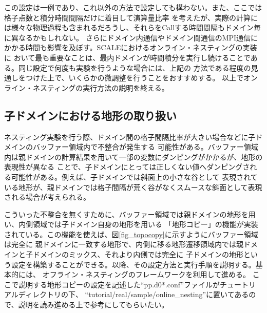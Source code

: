 この設定は一例であり、これ以外の方法で設定しても構わない。また、ここでは格子点数と積分時間間隔だけに着目して演算量比率
を考えたが、実際の計算には様々な物理過程も含まれるだろうし、それらをCallする時間間隔もドメイン毎に異なるかもしれない。
さらにドメイン内通信やドメイン間通信のMPI通信にかかる時間も影響を及ぼす。SCALEにおけるオンライン・ネスティングの実装に
おいて最も重要なことは、最内ドメインが時間積分を実行し続けることである。同じ設定で何度も実験を行うような場合には、上記の
方法である程度の見通しをつけた上で、いくらかの微調整を行うことをおすすめする。
以上でオンライン・ネスティングの実行方法の説明を終える。


\subsection{子ドメインにおける地形の取り扱い} \label{sec:nest_topo}
ネスティング実験を行う際、ドメイン間の格子間隔比率が大きい場合などに子ドメインのバッファー領域内で不整合が発生する
可能性がある。バッファー領域内は親ドメインの計算結果を用いて一部の変数にダンピングがかかるが、地形の表現性が異なる
ことで、子ドメインにとっては正しくない値へダンピングされる可能性がある。例えば、子ドメインでは斜面上の小さな谷として
表現されている地形が、親ドメインでは格子間隔が荒く谷がなくスムースな斜面として表現される場合が考えられる。

こういった不整合を無くすために、バッファー領域では親ドメインの地形を用い、内側領域では子ドメイン自身の地形を用いる
「地形コピー」の機能が実装されている。この機能を使えば、図\ref{fig_topocopy}に示すようにバッファー領域は完全に
親ドメインに一致する地形で、内側に移る地形遷移領域内では親ドメインと子ドメインのミックス、それより内側では完全に
子ドメインの地形という設定を構築することができる。以降、その設定方法と実行手順を説明する。基本的には、
オフライン・ネスティングのフレームワークを利用して進める。
ここで説明する地形コピーの設定を記述した``pp.d0*.conf''ファイルがチュートリアルディレクトリの下、
``tutorial/real/sample/online\_nesting''に置いてあるので、説明を読み進める上で参考にしてもらいたい。

